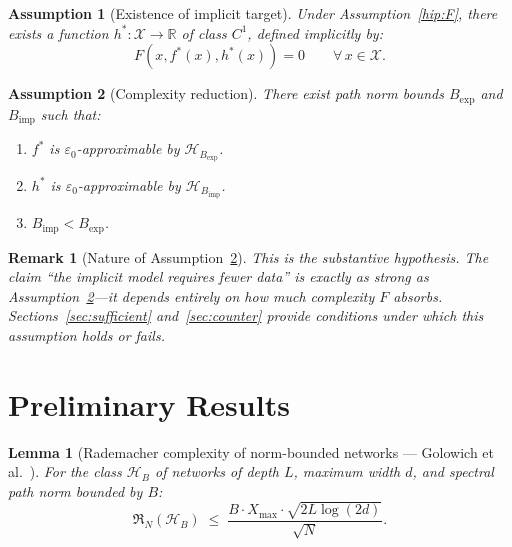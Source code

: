 \documentclass[12pt]{article}
\newtheorem{lemma}[theorem]{Lemma}
\newtheorem{assumption}{Assumption}
\newtheorem{remark}{Remark}
\newcommand{\R}{\mathbb{R}}
\newcommand{\Rad}{\mathfrak{R}}
\begin{document}
\begin{assumption}[Existence of implicit target]
\label{hip:h}
Under Assumption~\ref{hip:F}, there exists a function
$h^*: \mathcal{X} \to \R$ of class $C^1$, defined implicitly by:
\begin{equation}
  F(x, f^*(x), h^*(x)) = 0 \qquad \forall\, x \in \mathcal{X}.
\end{equation}
\end{assumption}

\begin{assumption}[Complexity reduction]
\label{hip:reduccion}
There exist path norm bounds $B_{\mathrm{exp}}$ and $B_{\mathrm{imp}}$
such that:
\begin{enumerate}[label=(\alph*)]
  \item $f^*$ is $\varepsilon_0$-approximable by
    $\mathcal{H}_{B_{\mathrm{exp}}}$.
  \item $h^*$ is $\varepsilon_0$-approximable by
    $\mathcal{H}_{B_{\mathrm{imp}}}$.
  \item $B_{\mathrm{imp}} < B_{\mathrm{exp}}$.
\end{enumerate}
\end{assumption}

\begin{remark}[Nature of Assumption~\ref{hip:reduccion}]
\label{rem:nature}
This is the substantive hypothesis.
The claim ``the implicit model requires fewer data'' is exactly as
strong as Assumption~\ref{hip:reduccion}---it depends entirely on
how much complexity $F$ absorbs.
Sections~\ref{sec:sufficient} and~\ref{sec:counter} provide
conditions under which this assumption holds or fails.
\end{remark}

\section{Preliminary Results}
\label{sec:prelim}

\begin{lemma}[Rademacher complexity of norm-bounded networks ---
Golowich et al.\ \cite{Golowich2018}]
\label{lema:rad}
For the class $\mathcal{H}_B$ of networks of depth $L$, maximum
width $d$, and spectral path norm bounded by $B$:
\begin{equation}
  \Rad_N(\mathcal{H}_B) \;\le\;
  \frac{B \cdot X_{\max} \cdot \sqrt{2L\log(2d)}}{\sqrt{N}}.
  \label{eq:rademacher_nn}
\end{equation}
\end{lemma}
\end{document}
